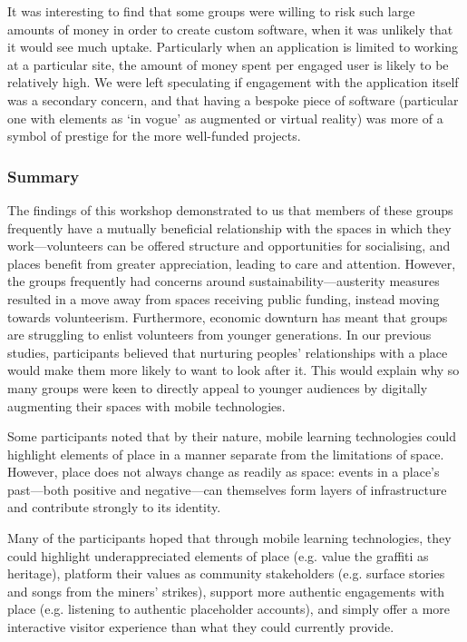 It was interesting to find that some groups were willing to risk such large amounts of money in order to create custom software, when it was unlikely that it would see much uptake. Particularly when an application is limited to working at a particular site, the amount of money spent per engaged user is likely to be relatively high. We were left speculating if engagement with the application itself was a secondary concern, and that having a bespoke piece of software (particular one with elements as `in vogue' as augmented or virtual reality) was more of a symbol of prestige for the more well-funded projects.

\subsubsection{Summary}
The findings of this workshop demonstrated to us that members of these groups frequently have a mutually beneficial relationship with the spaces in which they work---volunteers can be offered structure and opportunities for socialising, and places benefit from greater appreciation, leading to care and attention. However, the groups frequently had concerns around sustainability---austerity measures resulted in a move away from spaces receiving public funding, instead moving towards volunteerism. Furthermore, economic downturn has meant that groups are struggling to enlist volunteers from younger generations. In our previous studies, participants believed that nurturing peoples' relationships with a place would make them more likely to want to look after it. This would explain why so many groups were keen to directly appeal to younger audiences by digitally augmenting their spaces with mobile technologies. 

Some participants noted that by their nature, mobile learning technologies could highlight elements of place in a manner separate from the limitations of space. However, place does not always change as readily as space: events in a place's past---both positive and negative---can themselves form layers of infrastructure and contribute strongly to its identity. 

Many of the participants hoped that through mobile learning technologies, they could highlight underappreciated elements of place (e.g. value the graffiti as heritage), platform their values as community stakeholders (e.g. surface stories and songs from the miners' strikes), support more authentic engagements with place (e.g. listening to authentic placeholder accounts), and simply offer a more interactive visitor experience than what they could currently provide.


